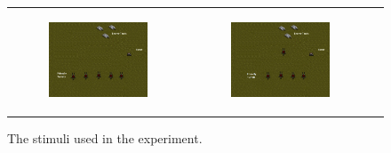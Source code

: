 \documentclass[11pt,letterpaper]{article}
\begin{document}
\begin{figure}
{\begin{tabular}{ccc}
\begin{subfigure}[b]{0.33\textwidth}\includegraphics[width=\textwidth]{figures/turrets.jpeg}\caption{}\label{fig:turrets-a}\end{subfigure}&
\begin{subfigure}[b]{0.33\textwidth}\includegraphics[width=\textwidth]{figures/turrets-plus-one.jpeg}\caption{}\label{fig:turrets-b}\end{subfigure}
\end{tabular}
}
\caption{The stimuli used in the experiment.}
\label{fig:exp_stimuli}
\end{figure}

\end{document}
